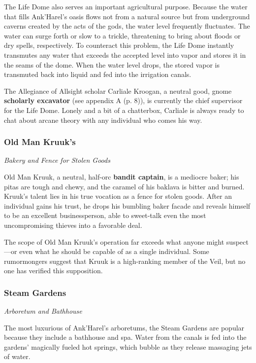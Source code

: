 \documentclass[a4paper, 11pt, bg=full, twocolumn, nooutline]{dndbook}
\begin{document}
The Life Dome also serves an important agricultural purpose. Because the water that fills Ank'Harel's oasis flows not from a natural source but from underground caverns created by the acts of the gods, the water level frequently fluctuates. The water can surge forth or slow to a trickle, threatening to bring about floods or dry spells, respectively. To counteract this problem, the Life Dome instantly transmutes any water that exceeds the accepted level into vapor and stores it in the seams of the dome. When the water level drops, the stored vapor is transmuted back into liquid and fed into the irrigation canals.

The Allegiance of Allsight scholar Carliale Kroogan, a neutral good, gnome \textbf{scholarly excavator} (see appendix A (p. 8)), is currently the chief supervisor for the Life Dome. Lonely and a bit of a chatterbox, Carliale is always ready to chat about arcane theory with any individual who comes his way.

\subsubsection{Old Man Kruuk's}

\textit{Bakery and Fence for Stolen Goods}

Old Man Kruuk, a neutral, half-orc \textbf{bandit captain}, is a mediocre baker; his pitas are tough and chewy, and the caramel of his baklava is bitter and burned. Kruuk's talent lies in his true vocation as a fence for stolen goods. After an individual gains his trust, he drops his bumbling baker facade and reveals himself to be an excellent businessperson, able to sweet-talk even the most uncompromising thieves into a favorable deal.

The scope of Old Man Kruuk's operation far exceeds what anyone might suspect---or even what he should be capable of as a single individual. Some rumormongers suggest that Kruuk is a high-ranking member of the Veil, but no one has verified this supposition.

\subsubsection{Steam Gardens}

\textit{Arboretum and Bathhouse}

The most luxurious of Ank'Harel's arboretums, the Steam Gardens are popular because they include a bathhouse and spa. Water from the canals is fed into the gardens' magically fueled hot springs, which bubble as they release massaging jets of water.
\end{document}
